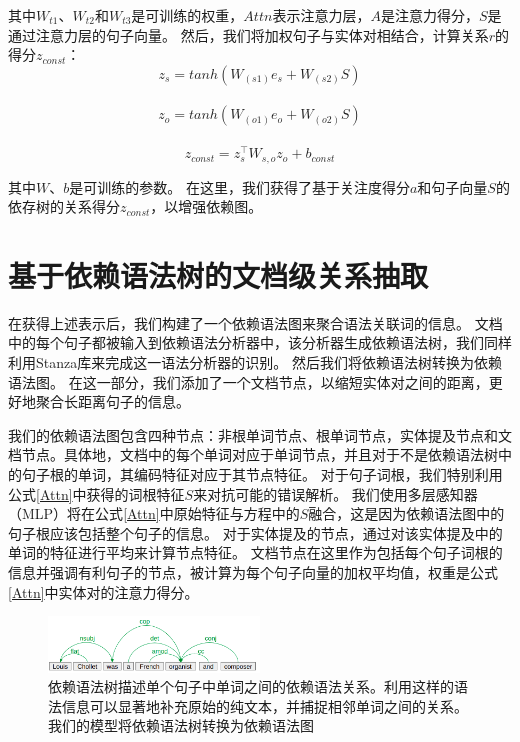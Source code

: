 \documentclass[bachelor]{thesis-uestc}
\begin{document}
其中$W_{t1}、W_{t2}$和$W_{t3}$是可训练的权重，$Attn$表示注意力层，$A$是注意力得分，$S$是通过注意力层的句子向量。
然后，我们将加权句子与实体对相结合，计算关系$r$的得分$z_{const}$：
\begin{equation}
    z_s = tanh(W_{(s1)}e_s+W_{(s2)}S)
\end{equation}
\\
\begin{equation}
    z_o = tanh(W_{(o1)}e_o+W_{(o2)}S)
\end{equation}
\\
\begin{equation}
    z_{const} = z_s^\top W_{s, o}z_o+b_{const}
\end{equation}

其中$W、b$是可训练的参数。
在这里，我们获得了基于关注度得分$a$和句子向量$S$的依存树的关系得分$z_{const}$，以增强依赖图。\par

\section{基于依赖语法树的文档级关系抽取}

在获得上述表示后，我们构建了一个依赖语法图来聚合语法关联词的信息。
文档中的每个句子都被输入到依赖语法分析器中，该分析器生成依赖语法树，我们同样利用Stanza库来完成这一语法分析器的识别。
然后我们将依赖语法树转换为依赖语法图。
在这一部分，我们添加了一个文档节点，以缩短实体对之间的距离，更好地聚合长距离句子的信息。\par

我们的依赖语法图包含四种节点：非根单词节点、根单词节点，实体提及节点和文档节点。具体地，文档中的每个单词对应于单词节点，并且对于不是依赖语法树中的句子根的单词，其编码特征对应于其节点特征。
对于句子词根，我们特别利用公式\ref{Attn}中获得的词根特征$S$来对抗可能的错误解析。
我们使用多层感知器（MLP）将在公式\ref{Attn}中原始特征与方程中的$S$融合，这是因为依赖语法图中的句子根应该包括整个句子的信息。
对于实体提及的节点，通过对该实体提及中的单词的特征进行平均来计算节点特征。
文档节点在这里作为包括每个句子词根的信息并强调有利句子的节点，被计算为每个句子向量的加权平均值，权重是公式\ref{Attn}中实体对的注意力得分。\par

\begin{figure}[t]
    \includegraphics[width=0.5\textwidth]{misc/dependency.png}
    \caption{依赖语法树描述单个句子中单词之间的依赖语法关系。利用这样的语法信息可以显著地补充原始的纯文本，并捕捉相邻单词之间的关系。我们的模型将依赖语法树转换为依赖语法图} 
\end{figure}\label{fig_syn_a}
\end{document}
